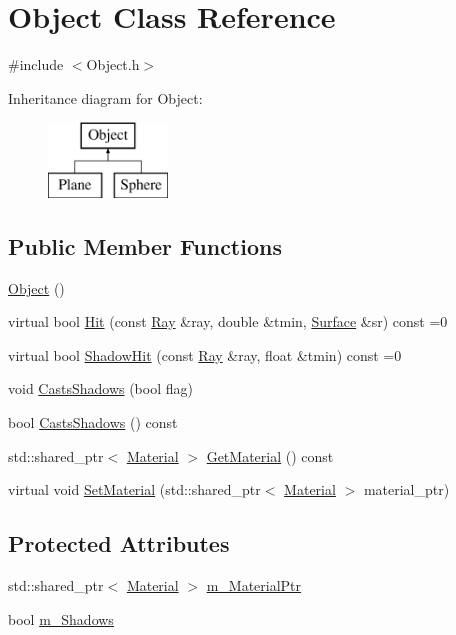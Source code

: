 \hypertarget{class_object}{}\section{Object Class Reference}
\label{class_object}


{\ttfamily \#include $<$Object.\+h$>$}

Inheritance diagram for Object\+:\begin{figure}[H]
\begin{center}
\leavevmode
\includegraphics[height=2.000000cm]{class_object}
\end{center}
\end{figure}
\subsection*{Public Member Functions}
\begin{DoxyCompactItemize}
\item 
\hyperlink{class_object_a40860402e64d8008fb42329df7097cdb}{Object} ()
\item 
virtual bool \hyperlink{class_object_ad9977e40c0a3048eba9a81b25efcf3ef}{Hit} (const \hyperlink{class_ray}{Ray} \&ray, double \&tmin, \hyperlink{class_surface}{Surface} \&sr) const =0
\item 
virtual bool \hyperlink{class_object_a020a6edbef7b2591b1dd6815ebbc5aa0}{Shadow\+Hit} (const \hyperlink{class_ray}{Ray} \&ray, float \&tmin) const =0
\item 
void \hyperlink{group___geometric_objects_ga74fa63e74026915a261117724303adfc}{Casts\+Shadows} (bool flag)
\item 
bool \hyperlink{group___geometric_objects_gab4254fb85f166245bb7234f5c5295777}{Casts\+Shadows} () const
\item 
std\+::shared\+\_\+ptr$<$ \hyperlink{class_material}{Material} $>$ \hyperlink{group___geometric_objects_ga7ad7172879f1b2fd092561827aa2bbb1}{Get\+Material} () const
\item 
virtual void \hyperlink{class_object_a791d7431f79b030866aa31c7c29ea0db}{Set\+Material} (std\+::shared\+\_\+ptr$<$ \hyperlink{class_material}{Material} $>$ material\+\_\+ptr)
\end{DoxyCompactItemize}
\subsection*{Protected Attributes}
\begin{DoxyCompactItemize}
\item 
std\+::shared\+\_\+ptr$<$ \hyperlink{class_material}{Material} $>$ \hyperlink{class_object_aa79a61ad1ff44b1585cc4972034cecbe}{m\+\_\+\+Material\+Ptr}
\item 
bool \hyperlink{class_object_a7cde4bccf1989da90c2d2b463876e179}{m\+\_\+\+Shadows}
\end{DoxyCompactItemize}


